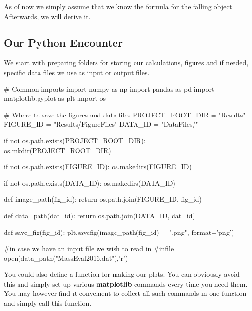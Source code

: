 \documentclass[%
oneside,                 %
final,                   %
10pt]{article}
\begin{document}
As of now we simply assume that   we know the formula for the falling object. Afterwards, we will derive it.

\subsection{Our Python Encounter}

We start with preparing folders for storing our calculations, figures and if needed, specific data files we use as input or output files.

































\bpycod
# Common imports
import numpy as np
import pandas as pd
import matplotlib.pyplot as plt
import os

# Where to save the figures and data files
PROJECT_ROOT_DIR = "Results"
FIGURE_ID = "Results/FigureFiles"
DATA_ID = "DataFiles/"

if not os.path.exists(PROJECT_ROOT_DIR):
    os.mkdir(PROJECT_ROOT_DIR)

if not os.path.exists(FIGURE_ID):
    os.makedirs(FIGURE_ID)

if not os.path.exists(DATA_ID):
    os.makedirs(DATA_ID)

def image_path(fig_id):
    return os.path.join(FIGURE_ID, fig_id)

def data_path(dat_id):
    return os.path.join(DATA_ID, dat_id)

def save_fig(fig_id):
    plt.savefig(image_path(fig_id) + ".png", format='png')

#in case we have an input file we wish to read in
#infile = open(data_path("MassEval2016.dat"),'r')

\epycod


You could also define a function for making our plots. You
can obviously avoid this and simply set up various \textbf{matplotlib}
commands every time you need them. You may however find it convenient
to collect all such commands in one function and simply call this
function.
\end{document}
